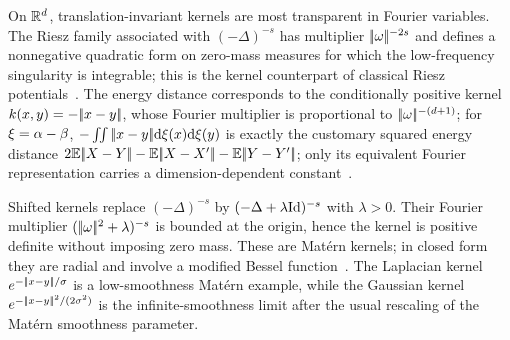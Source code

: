 \begin{example}
	On $\mathbb{R}^d$, translation-invariant kernels are most transparent in Fourier variables. The Riesz family associated with $(-\Delta)^{-s}$ has multiplier $|\!| \omega |\!|^{-2s}$ and defines a nonnegative quadratic form on zero-mass measures for which the low-frequency singularity is integrable; this is the kernel counterpart of classical Riesz potentials~\cite{berg84harmonic}. The energy distance corresponds to the conditionally positive kernel $k(x,y)=-|\!| x-y |\!|$, whose Fourier multiplier is proportional to $|\!| \omega |\!|^{-(d+1)}$; for $\xi=\alpha-\beta$,
	$-\iint|\!| x-y |\!|\mathrm{d}\xi(x)\mathrm{d}\xi(y)$ is exactly the customary squared energy distance
	$2\mathbb{E}|\!| X-Y |\!|-\mathbb{E}|\!| X-X' |\!|-\mathbb{E}|\!| Y-Y' |\!|$; only its equivalent Fourier representation carries a dimension-dependent constant~\cite{schoenberg38,szekely2004testing}.

Shifted kernels replace $(-\Delta)^{-s}$ by $(-\Delta+\lambda\mathrm{Id})^{-s}$ with $\lambda>0$. Their Fourier multiplier $(|\!| \omega |\!|^2+\lambda)^{-s}$ is bounded at the origin, hence the kernel is positive definite without imposing zero mass. These are Mat\'ern kernels; in closed form they are radial and involve a modified Bessel function~\cite{wendland2005scattered}. The Laplacian kernel $e^{-|\!| x-y |\!|/\sigma}$ is a low-smoothness Mat\'ern example, while the Gaussian kernel $e^{-|\!| x-y |\!|^2/(2\sigma^2)}$ is the infinite-smoothness limit after the usual rescaling of the Mat\'ern smoothness parameter.
\end{example}

